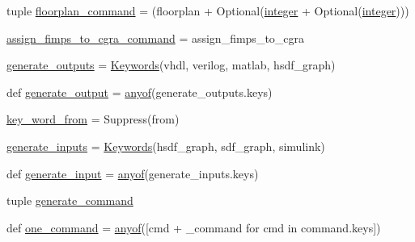 \begin{DoxyCompactItemize}
\item 
tuple \hyperlink{namespacesylva_1_1misc_1_1tcl__parser_a9dd05ec51936992522cb2776147d6794}{floorplan\+\_\+command} = (floorplan + Optional(\hyperlink{namespacesylva_1_1misc_1_1tcl__parser_aaa6da6af48cbfc02e2f6edd078ea16ab}{integer} + Optional(\hyperlink{namespacesylva_1_1misc_1_1tcl__parser_aaa6da6af48cbfc02e2f6edd078ea16ab}{integer})))
\item 
\hyperlink{namespacesylva_1_1misc_1_1tcl__parser_a2cff869e2129abd80f1679cc0becad35}{assign\+\_\+fimps\+\_\+to\+\_\+cgra\+\_\+command} = assign\+\_\+fimps\+\_\+to\+\_\+cgra
\item 
\hyperlink{namespacesylva_1_1misc_1_1tcl__parser_a77b6ae03d7943edc073dde7d9883d925}{generate\+\_\+outputs} = \hyperlink{classsylva_1_1misc_1_1tcl__parser_1_1_keywords}{Keywords}(\textquotesingle{}vhdl\textquotesingle{}, \textquotesingle{}verilog\textquotesingle{}, \textquotesingle{}matlab\textquotesingle{}, \textquotesingle{}hsdf\+\_\+graph\textquotesingle{})
\item 
def \hyperlink{namespacesylva_1_1misc_1_1tcl__parser_ab0d1caae304d09d067e44d8b51e0b341}{generate\+\_\+output} = \hyperlink{namespacesylva_1_1misc_1_1tcl__parser_abc9d84dd4132e13b642242dfac628084}{anyof}(generate\+\_\+outputs.\+keys)
\item 
\hyperlink{namespacesylva_1_1misc_1_1tcl__parser_adf51aa24e01a036ffcac0e6996994051}{key\+\_\+word\+\_\+from} = Suppress(\textquotesingle{}from\textquotesingle{})
\item 
\hyperlink{namespacesylva_1_1misc_1_1tcl__parser_a77cc734b69238034c98fadaceef2fbc3}{generate\+\_\+inputs} = \hyperlink{classsylva_1_1misc_1_1tcl__parser_1_1_keywords}{Keywords}(\textquotesingle{}hsdf\+\_\+graph\textquotesingle{}, \textquotesingle{}sdf\+\_\+graph\textquotesingle{}, \textquotesingle{}simulink\textquotesingle{})
\item 
def \hyperlink{namespacesylva_1_1misc_1_1tcl__parser_ae4978fc0cd51c6f590351e10d46bda95}{generate\+\_\+input} = \hyperlink{namespacesylva_1_1misc_1_1tcl__parser_abc9d84dd4132e13b642242dfac628084}{anyof}(generate\+\_\+inputs.\+keys)
\item 
tuple \hyperlink{namespacesylva_1_1misc_1_1tcl__parser_a09154238372afd143ddb6fdd344dbf1e}{generate\+\_\+command}
\item 
def \hyperlink{namespacesylva_1_1misc_1_1tcl__parser_aeab8373fb1283d1df4dccb93acde4290}{one\+\_\+command} = \hyperlink{namespacesylva_1_1misc_1_1tcl__parser_abc9d84dd4132e13b642242dfac628084}{anyof}(\mbox{[}cmd + \textquotesingle{}\+\_\+command\textquotesingle{} for cmd in command.\+keys\mbox{]})
\end{DoxyCompactItemize}


